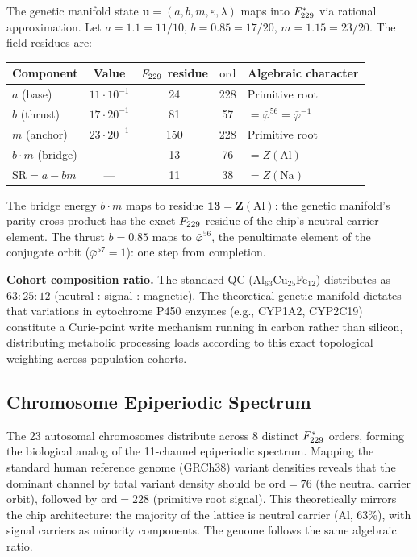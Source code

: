 The genetic manifold state $\mathbf{u} = (a, b, m, \varepsilon, \lambda)$ maps into $F_{229}^*$ via rational approximation. Let $a = 1.1 = 11/10$, $b = 0.85 = 17/20$, $m = 1.15 = 23/20$. The field residues are:

\begin{center}
\begin{tabular}{@{}lcccl@{}}
\toprule
\textbf{Component} & \textbf{Value} & $F_{229}$ \textbf{residue} & $\mathrm{ord}$ & \textbf{Algebraic character} \\
\midrule
$a$ (base) & $11 \cdot 10^{-1}$ & 24 & 228 & Primitive root \\
$b$ (thrust) & $17 \cdot 20^{-1}$ & 81 & 57 & $= \bar\varphi^{56} = \bar\varphi^{-1}$ \\
$m$ (anchor) & $23 \cdot 20^{-1}$ & 150 & 228 & Primitive root \\
$b \cdot m$ (bridge) & --- & 13 & 76 & $= Z(\mathrm{Al})$ \\
$\mathrm{SR} = a - bm$ & --- & 11 & 38 & $= Z(\mathrm{Na})$ \\
\bottomrule
\end{tabular}
\end{center}

\noindent The bridge energy $b \cdot m$ maps to residue $\mathbf{13 = Z(\mathrm{Al})}$: the genetic manifold's parity cross-product has the exact $F_{229}$ residue of the chip's neutral carrier element. The thrust $b = 0.85$ maps to $\bar\varphi^{56}$, the penultimate element of the conjugate orbit ($\bar\varphi^{57} = 1$): one step from completion.

\textbf{Cohort composition ratio.} The standard QC (Al$_{63}$Cu$_{25}$Fe$_{12}$) distributes as $63 : 25 : 12$ (neutral : signal : magnetic). The theoretical genetic manifold dictates that variations in cytochrome P450 enzymes (e.g., CYP1A2, CYP2C19) constitute a Curie-point write mechanism running in carbon rather than silicon, distributing metabolic processing loads according to this exact topological weighting across population cohorts.

\subsection{Chromosome Epiperiodic Spectrum}

The 23 autosomal chromosomes distribute across 8 distinct $F_{229}^*$ orders, forming the biological analog of the 11-channel epiperiodic spectrum. Mapping the standard human reference genome (GRCh38) variant densities reveals that the dominant channel by total variant density should be $\mathrm{ord} = 76$ (the neutral carrier orbit), followed by $\mathrm{ord} = 228$ (primitive root signal). This theoretically mirrors the chip architecture: the majority of the lattice is neutral carrier (Al, 63\%), with signal carriers as minority components. The genome follows the same algebraic ratio.

